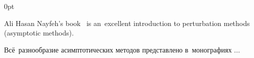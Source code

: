 \begin{changemargin}{\parindent}{0pt}
\fontsize{10}{12}\selectfont

\begin{otherlanguage}{russian}

Ali Hasan Nayfeh’s book~\cite{nayfeh-perturbation} is an~excellent introduction to perturbation methods (asymptotic methods).

Всё~разнообразие асимптотических методов представлено в~монографиях ...

\end{otherlanguage}

\end{changemargin}

